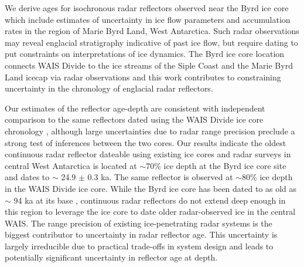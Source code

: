 

We derive ages for isochronous radar reflectors observed near the Byrd ice core which include estimates of uncertainty in ice flow parameters and accumulation rates in the region of Marie Byrd Land, West Antarctica. Such radar observations may reveal englacial stratigraphy indicative of past ice flow, but require dating to put constraints on interpretations of ice dynamics. The Byrd ice core location connects WAIS Divide to the ice streams of the Siple Coast and the Marie Byrd Land icecap via radar observations and this work contributes to constraining uncertainty in the chronology of englacial radar reflectors.

Our estimates of the reflector age-depth are consistent with independent comparison to the same reflectors dated using the WAIS Divide ice core chronology \citep{buizert2015}, although large uncertainties due to radar range precision preclude a strong test of inferences between the two cores. Our results indicate the oldest continuous radar reflector dateable using existing ice cores and radar surveys in central West Antarctica is located at $\sim$70\% ice depth at the Byrd ice core site and dates to $\sim$ 24.9 $\pm$ 0.3 ka. The same reflector is observed at $\sim$80\% ice depth in the WAIS Divide ice core. While the Byrd ice core has been dated to as old as $\sim$ 94 ka at its base \citep{blunier2001}, continuous radar reflectors do not extend deep enough in this region to leverage the ice core to date older radar-observed ice in the central WAIS. The range precision of existing ice-penetrating radar systems is the biggest contributor to uncertainty in radar reflector age. This uncertainty is largely irreducible due to practical trade-offs in system design and leads to potentially significant uncertainty in reflector age at depth. 







